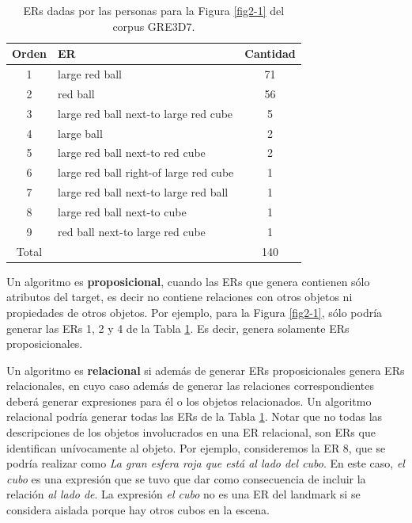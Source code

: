 \begin{table}[h!]
\begin{center}
\begin{tabular}{|c|l|c|}
\hline
 Orden&ER& Cantidad \\
\hline
1&large red ball & 71 \\
2&red ball & 56 \\ 
3&large red ball next-to large red cube & 5 \\ 
4&large ball & 2 \\ 
5&large red ball next-to red cube & 2 \\ 
6&large red ball right-of large red cube & 1 \\ 
7&large red ball next-to large red ball & 1 \\ 
8&large red ball next-to cube & 1 \\ 
9&red ball next-to large red cube & 1 \\ \hline
Total & &140 \\ \hline
\end{tabular}
\caption{ERs dadas por las personas para la Figura \ref{fig2-1} del corpus GRE3D7.} 
\label{er-gre3d7-stimulus}
\vspace*{-.5cm}
\end{center}
\end{table}

Un algoritmo es {\bf proposicional}, cuando las ERs que genera contienen s\'olo atributos del target, es decir no contiene relaciones con otros objetos ni propiedades de otros objetos. Por ejemplo, para la Figura \ref{fig2-1}, s\'olo podr\'ia generar las ERs 1, 2 y 4 de la Tabla \ref{er-gre3d7-stimulus}. Es decir, genera solamente ERs proposicionales.

Un algoritmo es {\bf relacional} si adem\'as de generar ERs proposicionales genera ERs relacionales, en cuyo caso adem\'as de generar las relaciones correspondientes deber\'a generar expresiones para \'el o los objetos relacionados. Un algoritmo relacional podr\'ia generar todas las ERs de la Tabla \ref{er-gre3d7-stimulus}. Notar que no todas las descripciones de los objetos involucrados en una ER relacional, son ERs que identifican un\'ivocamente al objeto. Por ejemplo, consideremos la ER 8, que se podr\'ia realizar como {\it La gran esfera roja que est\'a al lado del cubo}. En este caso, {\it el cubo} es una expresi\'on que se tuvo que dar como consecuencia de incluir la relaci\'on {\it al lado de}. La expresi\'on {\it el cubo} no es una ER del landmark si se considera aislada porque hay otros cubos en la escena. 

